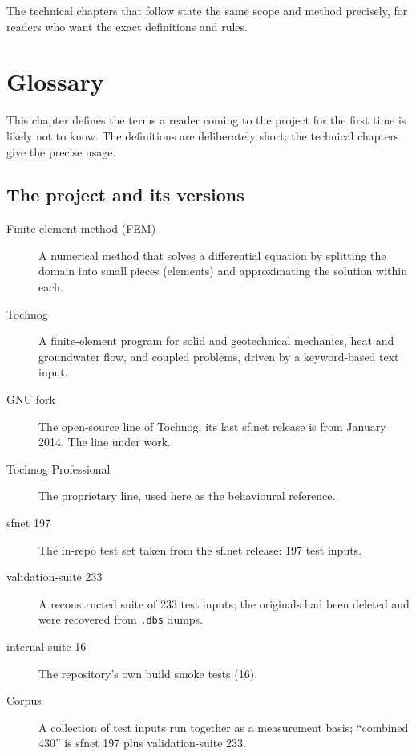 \documentclass[11pt,a4paper]{report}
\newcommand{\code}[1]{\texttt{#1}}
\begin{document}
The technical chapters that follow state the same scope and method precisely,
for readers who want the exact definitions and rules.

\chapter{Glossary}
\label{ch:glossary}

This chapter defines the terms a reader coming to the project for the first
time is likely not to know. The definitions are deliberately short; the
technical chapters give the precise usage.

\section*{The project and its versions}
\begin{description}
  \item[Finite-element method (FEM)] A numerical method that solves a
        differential equation by splitting the domain into small pieces
        (elements) and approximating the solution within each.
  \item[Tochnog] A finite-element program for solid and geotechnical
        mechanics, heat and groundwater flow, and coupled problems, driven by a
        keyword-based text input.
  \item[GNU fork] The open-source line of Tochnog; its last sf.net release is
        from January 2014. The line under work.
  \item[Tochnog Professional] The proprietary line, used here as the
        behavioural reference.
  \item[sfnet 197] The in-repo test set taken from the sf.net release: 197 test
        inputs.
  \item[validation-suite 233] A reconstructed suite of 233 test inputs; the
        originals had been deleted and were recovered from \code{.dbs} dumps.
  \item[internal suite 16] The repository's own build smoke tests (16).
  \item[Corpus] A collection of test inputs run together as a measurement
        basis; ``combined 430'' is sfnet 197 plus validation-suite 233.
\end{description}
\end{document}
